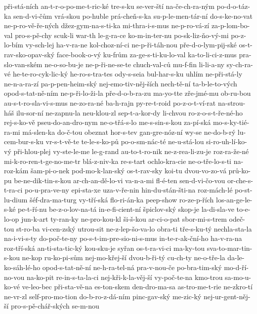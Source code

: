 {při-stá-ních
an-t-r-o-po-me-t-ric-ké
tre-s-ku
se-ver-ští
na-če-ch-ra-ným
po-d-o-táz-ka
sen-d-vi-čům
vrá-skou
po-huble
prá-cheň-s-ka
su-p-le-men-tár-ní
do-s-ke-no-vat
ne-p-ro-vě-ře-ných
džez-gym-na-s-ti-ka
mi-thra-i-s-mus
ne-p-ro-vá-zí
za-p-lom-bo-val
pro-s-pě-chy
scuk-li
war-th
le-g-ra-ce
ko-m-in-ter-nu
po-sk-liz-ňo-vý-mi
po-z-lo-bím
vy-sch-lej
ha-v-ra-ne
kol-choz-ní-ci
ne-p-ři-táh-nou
pře-d-o-lym-pij-ské
os-t-rav-sko-opav-ský
face-book-o-vý
ku-frům
za-ge-s-ti-ku-lo-val
ka-to-li-ci-z-mus
pra-slo-van-ském
ne-o-so-bu-je
ne-p-ři-ne-se-te
chuch-val-ců
mu-f-fin
li-li-a-ny
sy-ch-ra-vé
he-te-ro-cyk-lic-ký
he-ro-s-tra-tes
ody-s-seia
bul-har-s-ku
uhlím
ne-při-stá-ly
ne-n-a-ra-zí
pa-p-pen-heim-ský
nej-emo-tiv-něj-ších
nech-tě-ní
ta-b-le-to-vých
opod-s-tat-ně-ním
ne-p-ři-lo-ži-la
pře-d-o-b-ra-zu
ma-yo-tte
zře-jmé-mu
ob-ru-bou
au-s-t-ro-sla-vi-s-mus
ne-zo-ra-né
ba-h-rajn
py-re-t-roid
po-z-o-t-ví-rat
na-strou-háš
ilu-sor-ní
ne-zapnu-la
neu-klou-zl
sep-t-a-kor-dy
li-chvou
ro-z-o-s-t-ře-né-ho
rej-s-ko-vě
pseu-do-an-dro-nym
ne-o-třá-s-lo
me-s-sin-s-kou
za-pí-ská
mo-s-ky-tié-ra-mi
má-slen-ka
do-č-tou
obeznat
hor-s-tev
gan-gre-nóz-ní
wy-se
ne-do-b-rý
lu-cem-bur-s-ku
vr-s-t-vě-te
te-le-s-ko-pů
po-o-sm-nác-té
ne-u-stá-lou
si-ro-uh-lí-ko-vý
při-hlou-plej
vy-ste-le-me
le-g-rand
au-to-t-ro-nik
ne-z-rea-li-zu-je
roz-ra-že-né
mi-k-ro-ren-t-ge-no-me-tr
blá-z-niv-ka
re-s-tart
ochlo-kra-cie
ne-o-tře-lo-s-ti
na-roz-kám
šam-pi-o-nek
pod-mo-k-lan-ský
os-t-rav-sky
koi-tu
dvou-vo-zo-vá
prů-ko-pu
be-ne-dik-tin-s-kou
ar-ch-an-dě-lo-vi
va-n-a-mi
fl-é-ten
sen-d-vi-čo-vou
or-che-s-t-ra-ci
po-u-pra-ve-ny
epi-sta-xe
uza-v-ře-nin
hin-du-stán-šti-na
roz-mách-lé
po-st-lu-dium
šéf-dra-ma-turg
vy-tří-ská
flo-ri-án-ka
peep-show
ro-ze-p-řích
los-an-ge-le-s-ké
pe-t-ří-nu
be-z-o-lov-na-tá
in-e-fi-cient-ní
špiclov-ský
skop-je
la-di-sla-ve
to-e-lo-op
jun-k-art
ty-ran-ky
ne-pro-kou-kl
ši-š-kou
ar-ci-o-pat
sbor-mi-s-trem
odeč-tou
st-ro-ba
vi-cen-zský
utrou-sit
ne-z-lep-šo-va-lo
obra-ti
tře-s-ku-tý
nechla-sta-la
na-i-vi-s-ty
do-poč-te-ny
po-s-t-im-pre-sio-ni-s-mus
in-te-r-ak-ční-ho
ha-v-ra-na
roz-tří-ská
an-ti-sta-tic-ký
kou-sku-je
syřan
os-t-ra-vi-ci
ma-ky-tou
sva-to-mar-tin-s-kou
ne-kop
ru-ko-pi-sům
nej-mo-křej-ší
dvou-b-ři-tý
cu-ch-ty
ne-o-tře-la
da-le-ko-sáh-lé-ho
opod-s-tat-ně-ní
ne-h-ra-tel-ná
pra-v-nou-če
po-bra-tim-ský
mo-d-ří-no-vou
na-ko-pit
re-in-s-ta-la-ci
nej-kři-k-la-věj-ší
vy-poč-te-na
kmo-trou
sa-mo-u-ko-vé
ve-leo-bec
při-sta-vě-na
es-ton-skem
den-dro-ma-sa
as-tro-me-t-rie
ne-zkro-tí
ne-vr-zl
self-pro-mo-tion
do-b-ro-z-dá-ním
pinc-gav-ský
me-zic-ký
nej-ur-gent-něj-ší
pro-s-pě-chář-ských
se-m-nou
}
